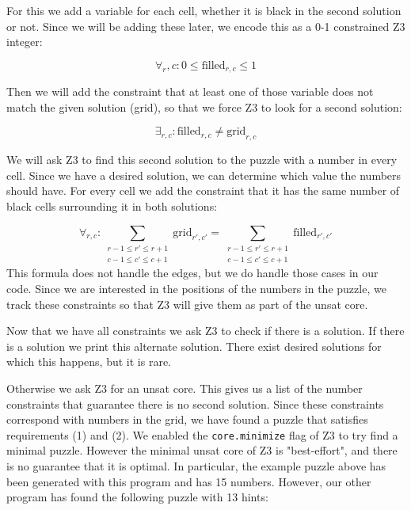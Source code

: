 \documentclass{scrartcl}
\begin{document}
	For this we add a variable for each cell, whether it is black in the second solution or not. Since we will be adding these later, we encode this as a 0-1 constrained Z3 integer:

	$$\forall_r,c:  0 \le \text{filled}_{r,c} \le 1$$

	Then we will add the constraint that at least one of those variable does not match the given solution (grid), so that we force Z3 to look for a second solution:

	$$\exists_{r,c}:  \text{filled}_{r,c} \ne \text{grid}_{r,c}$$

	We will ask Z3 to find this second solution to the puzzle with a number in every cell. Since we have a desired solution, we can determine which value the numbers should have. For every cell we add the constraint that it has the same number of black cells surrounding it in both solutions:

	$$\forall_{r,c}: \sum_{\substack{r-1\le r' \le r+1\\c-1\le c'\le c+1}}\text{grid}_{r',c'} = \sum_{\substack{r-1\le r' \le r+1\\c-1\le c'\le c+1}}\text{filled}_{r',c'}$$
	This formula does not handle the edges, but we do handle those cases in our code. Since we are interested in the positions of the numbers in the puzzle, we track these constraints so that Z3 will give them as part of the unsat core.

	Now that we have all constraints we ask Z3 to check if there is a solution.
	If there is a solution we print this alternate solution.
	There exist desired solutions for which this happens, but it is rare.

	Otherwise we ask Z3 for an unsat core. This gives us a list of the number constraints that guarantee there is no second solution. Since these constraints correspond with numbers in the grid, we have found a puzzle that satisfies requirements (1) and (2). We enabled the \texttt{core.minimize} flag of Z3 to try find a minimal puzzle. However the minimal unsat core of Z3 is "best-effort", and there is no guarantee that it is optimal. In particular, the example puzzle above has been generated with this program and has 15 numbers. However, our other program has found the following puzzle with 13 hints:

	\begin{figure}[H]
		\centering
		
	\end{figure}
\end{document}

